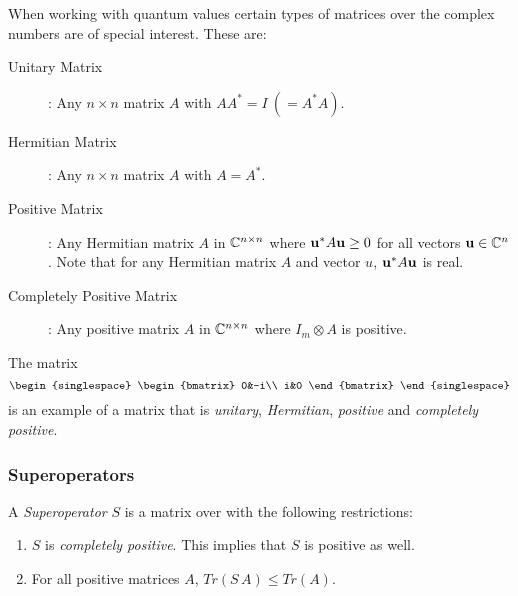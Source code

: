 When working with quantum values certain types of matrices over the complex numbers are of special
interest. These are:
\begin{description}
  \item[Unitary Matrix]: Any $n \times n$  matrix $A$ with $A A^{*} = I\ (= A^{*} A)$.
  \item[Hermitian Matrix]: Any  $n \times n$ matrix $A$ with $A=A^{*}$.
  \item[Positive Matrix]: Any Hermitian matrix $A$ in  $\mathbb{C}^{n\times n}$
    where $\mathbf{u}^{*} A \mathbf{u} \ge 0$ for all vectors  $\mathbf{u}\in \mathbb{C}^n$. Note
    that for any Hermitian matrix $A$ and vector $u$,  $\mathbf{u}^{*} A \mathbf{u}$ is real.
  \item[Completely Positive Matrix]: Any positive matrix $A$ in  $\mathbb{C}^{n\times n}$
    where $I_m \otimes A$ is positive.
\end{description}
The matrix
  \[
    {\begin{singlespace}
      \begin{bmatrix}
        0&-i\\
        i&0
      \end{bmatrix}
    \end{singlespace}}
  \]
is an example of a matrix that is \emph{unitary}, \emph{Hermitian}, \emph{positive} and
\emph{completely positive}.



\subsubsection{Superoperators} %
\label{ssub:superoperators}

A \emph{Superoperator} $S$ is a matrix over \complex{} with the following restrictions:
\begin{enumerate}
  \item{} $S$ is \emph{completely positive}. This implies that $S$ is positive as well.
  \item{} For all positive matrices $A$, $Tr(S\,A) \leq Tr(A)$.
\end{enumerate}


